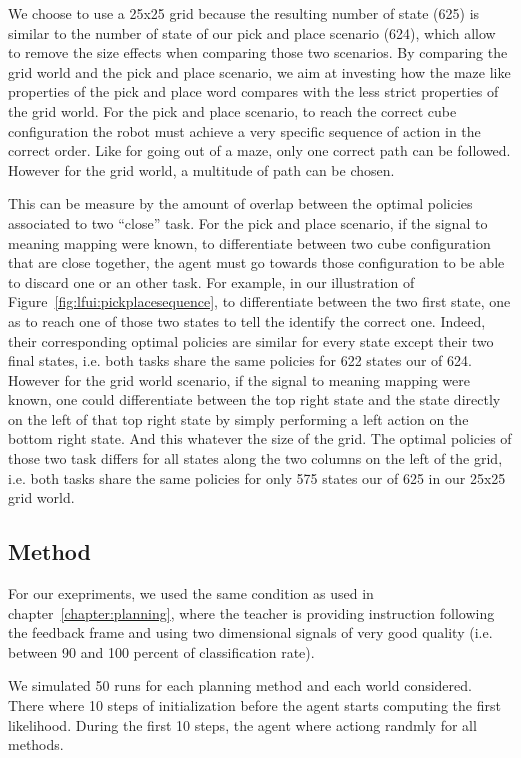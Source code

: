 We choose to use a 25x25 grid because the resulting number of state (625) is similar to the number of state of our pick and place scenario (624), which allow to remove the size effects when comparing those two scenarios. By comparing the grid world and the pick and place scenario, we aim at investing how the maze like properties of the pick and place word compares with the less strict properties of the grid world. For the pick and place scenario, to reach the correct cube configuration the robot must achieve a very specific sequence of action in the correct order. Like for going out of a maze, only one correct path can be followed. However for the grid world, a multitude of path can be chosen. 

This can be measure by the amount of overlap between the optimal policies associated to two ``close'' task. For the pick and place scenario, if the signal to meaning mapping were known, to differentiate between two cube configuration that are close together, the agent must go towards those configuration to be able to discard one or an other task. For example, in our illustration of Figure~\ref{fig:lfui:pickplacesequence}, to differentiate between the two first state, one as to reach one of those two states to tell the identify the correct one. Indeed, their corresponding optimal policies are similar for every state except their two final states, i.e. both tasks share the same policies for 622 states our of 624. However for the grid world scenario, if the signal to meaning mapping were known, one could differentiate between the top right state and the state directly on the left of that top right state by simply performing a left action on the bottom right state. And this whatever the size of the grid. The optimal policies of those two task differs for all states along the two columns on the left of the grid, i.e. both tasks share the same policies for only 575 states our of 625 in our 25x25 grid world.

\subsection{Method}

For our exepriments, we used the same condition as used in chapter~\ref{chapter:planning}, where the teacher is providing instruction following the feedback frame and using two dimensional signals of very good quality (i.e. between 90 and 100 percent of classification rate).

We simulated 50 runs for each planning method and each world considered. There where 10 steps of initialization before the agent starts computing the first likelihood. During the first 10 steps, the agent where actiong randmly for all methods.

